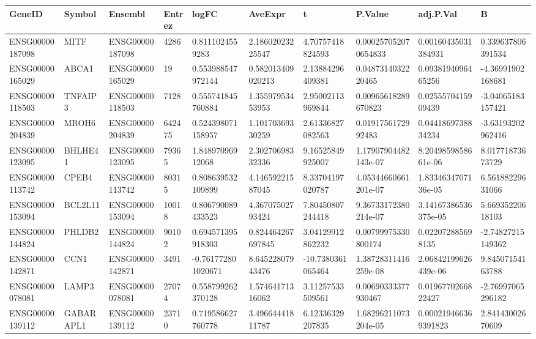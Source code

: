 \begingroup
\tiny
\setlength{\tabcolsep}{2pt}
\renewcommand{\arraystretch}{1.18}
\begin{tabular}{@{}llllllllll@{}}
\toprule
GeneID & Symbol & Ensembl & Entrez & logFC & AveExpr & t & P.Value & adj.P.Val & B \\
\midrule
ENSG00000187098 & MITF & ENSG00000187098 & 4286 & 0.8111024559283 & 2.18602023225547 & 4.70757418824593 & 0.000257052070654833 & 0.00160435031384931 & 0.339637806391534 \\
ENSG00000165029 & ABCA1 & ENSG00000165029 & 19 & 0.553988547972144 & 0.582013409020213 & 2.13884296409381 & 0.0487314032220465 & 0.0938194096465256 & -4.36991902168681 \\
ENSG00000118503 & TNFAIP3 & ENSG00000118503 & 7128 & 0.555741845760884 & 1.35597953453953 & 2.95002113969844 & 0.00965618289670823 & 0.0255570415909439 & -3.04065183157421 \\
ENSG00000204839 & MROH6 & ENSG00000204839 & 642475 & 0.524398071158957 & 1.10170369330259 & 2.61336827082563 & 0.0191756172992483 & 0.0441869738834234 & -3.63193202962416 \\
ENSG00000123095 & BHLHE41 & ENSG00000123095 & 79365 & 1.84897096912068 & 2.30270698332336 & 9.16525849925007 & 1.17907904482143e-07 & 8.2049859858661e-06 & 8.01771873673729 \\
ENSG00000113742 & CPEB4 & ENSG00000113742 & 80315 & 0.808639532109899 & 4.14659221587045 & 8.33704197020787 & 4.05344660661201e-07 & 1.8334634707136e-05 & 6.56188229631066 \\
ENSG00000153094 & BCL2L11 & ENSG00000153094 & 10018 & 0.806790089433523 & 4.36707502793424 & 7.80450807244418 & 9.36733172380214e-07 & 3.14167386536375e-05 & 5.66935220618103 \\
ENSG00000144824 & PHLDB2 & ENSG00000144824 & 90102 & 0.694571395918303 & 0.824464267697845 & 3.04129912862232 & 0.00799975330800174 & 0.022072885698135 & -2.74827215149362 \\
ENSG00000142871 & CCN1 & ENSG00000142871 & 3491 & -0.761772801020671 & 8.64522807943476 & -10.7380361065464 & 1.38728311416259e-08 & 2.06842199626439e-06 & 9.84507154163788 \\
ENSG00000078081 & LAMP3 & ENSG00000078081 & 27074 & 0.558799262370128 & 1.57464171316062 & 3.11257533509561 & 0.00690333377930467 & 0.0196770266822427 & -2.76997065296182 \\
ENSG00000139112 & GABARAPL1 & ENSG00000139112 & 23710 & 0.719586627760778 & 3.49664441811787 & 6.12336329207835 & 1.68296211073204e-05 & 0.000219466369391823 & 2.84143002670609 \\

\end{tabular}
